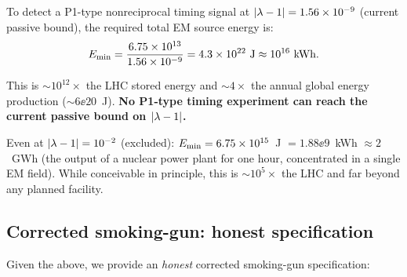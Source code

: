 \begin{theorem}
\label{thm:unreachable}
To detect a P1-type nonreciprocal timing signal at $|\lambda - 1| = 1.56\times 10^{-9}$
(current passive bound), the required total EM source energy is:
\begin{equation}
E_{\rm min} = \frac{6.75\times 10^{13}}{1.56\times 10^{-9}} = 4.3\times 10^{22}~\text{J}
\approx 10^{16}~\text{kWh}.
\label{eq:E_min_passive}
\end{equation}

This is $\sim 10^{12}\times$ the LHC stored energy and $\sim 4\times$ the
annual global energy production ($\sim 6\ee{20}$~J). \textbf{No P1-type
timing experiment can reach the current passive bound on $|\lambda - 1|$.}

Even at $|\lambda - 1| = 10^{-2}$ (excluded): $E_{\rm min} = 6.75\times 10^{15}$~J
$= 1.88\ee{9}$~kWh $\approx 2$~GWh (the output of a nuclear power plant
for one hour, concentrated in a single EM field). While conceivable in
principle, this is $\sim 10^5\times$ the LHC and far beyond any planned
facility.
\end{theorem}

\subsection{Corrected smoking-gun: honest specification}
\label{ssec:corrected_spec}

Given the above, we provide an \emph{honest} corrected smoking-gun
specification:

